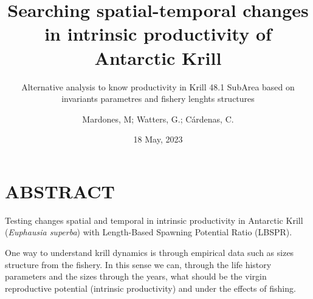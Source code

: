\documentclass[
]{article}
\title{Searching spatial-temporal changes in intrinsic productivity of
Antarctic Krill}
\subtitle{Alternative analysis to know productivity in Krill 48.1
SubArea based on invariants parametres and fishery lenghts structures}
\author{Mardones, M; Watters, G.; Cárdenas, C.}
\date{18 May, 2023}
\newenvironment{Shaded}{\begin{snugshade}}{\end{snugshade}}
\newcommand{\AttributeTok}[1]{\textcolor[rgb]{0.77,0.63,0.00}{#1}}
\newcommand{\CommentTok}[1]{\textcolor[rgb]{0.56,0.35,0.01}{\textit{#1}}}
\newcommand{\ConstantTok}[1]{\textcolor[rgb]{0.00,0.00,0.00}{#1}}
\newcommand{\DecValTok}[1]{\textcolor[rgb]{0.00,0.00,0.81}{#1}}
\newcommand{\FunctionTok}[1]{\textcolor[rgb]{0.00,0.00,0.00}{#1}}
\newcommand{\NormalTok}[1]{#1}
\newcommand{\SpecialCharTok}[1]{\textcolor[rgb]{0.00,0.00,0.00}{#1}}
\newcommand{\StringTok}[1]{\textcolor[rgb]{0.31,0.60,0.02}{#1}}
\begin{document}
\maketitle

\fontsize{12}{16}
\selectfont{}

\newpage

\setcounter{tocdepth}{3}
\tableofcontents

\newpage

\begin{Shaded}
\end{Shaded}

\hypertarget{abstract}{%
\section{ABSTRACT}\label{abstract}}

Testing changes spatial and temporal in intrinsic productivity in
Antarctic Krill (\emph{Euphausia superba}) with Length-Based Spawning
Potential Ratio (LBSPR).

One way to understand krill dynamics is through empirical data such as
sizes structure from the fishery. In this sense we can, through the life
history parameters and the sizes through the years, what should be the
virgin reproductive potential (intrinsic productivity) and under the
effects of fishing.
\end{document}
